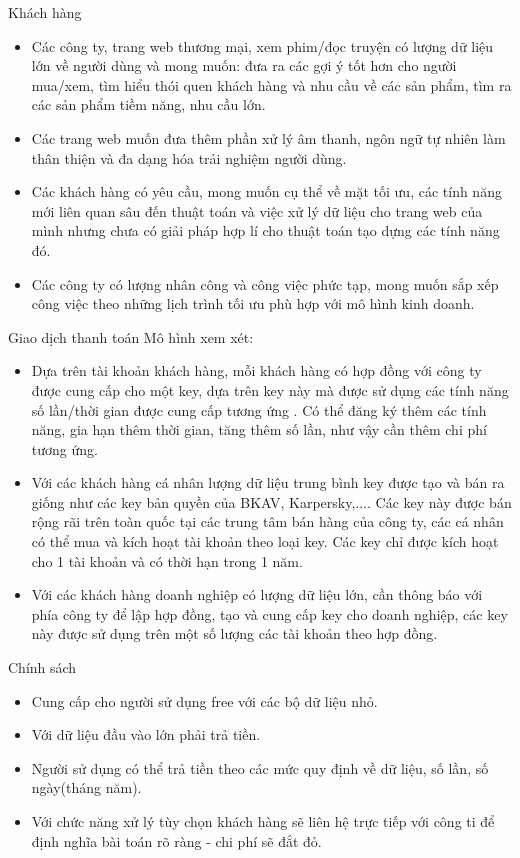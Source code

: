 \documentclass{beamer}
\begin{document}
\begin{frame}{Khách hàng}
\begin{itemize}
\item Các công ty, trang web  thương mại, xem phim/đọc truyện có lượng dữ liệu lớn về người dùng và mong muốn: đưa ra các gợi ý tốt hơn cho người mua/xem, tìm hiểu thói quen khách hàng và nhu cầu về các sản phẩm, tìm ra các sản phẩm tiềm năng, nhu cầu lớn.
\item Các trang web muốn đưa thêm phần xử lý âm thanh, ngôn ngữ tự nhiên làm thân thiện và đa dạng hóa trải nghiệm người dùng.
\item Các khách hàng có yêu cầu, mong muốn cụ thể về mặt tối ưu, các tính năng mới liên quan sâu đến thuật toán và việc xử lý dữ liệu cho trang web của mình nhưng chưa có giải pháp hợp lí cho thuật toán tạo dựng các tính năng đó.
\item Các công ty có lượng nhân công và công việc phức tạp, mong muốn sắp xếp công việc theo những lịch trình tối ưu phù hợp với mô hình kinh doanh.
\end{itemize}
\end{frame}
\begin{frame}{Giao dịch thanh toán}
Mô hình xem xét:
\begin{itemize}
\item Dựa trên tài khoản khách hàng, mỗi khách hàng có hợp đồng với công ty được cung cấp cho một key, dựa trên key này mà được sử dụng các tính năng số lần/thời gian  được cung cấp tương ứng . Có thể đăng ký thêm các tính năng, gia hạn thêm thời gian, tăng thêm số lần,  như vậy cần thêm chi phí tương ứng.
\item Với các khách hàng cá nhân lượng dữ liệu trung bình key được tạo và bán ra giống như các key bản quyền của BKAV, Karpersky,.... Các key này được bán rộng rãi trên toàn quốc tại các trung tâm bán hàng của công ty, các cá nhân có thể mua và kích hoạt tài khoản theo loại key. Các key chỉ được kích hoạt cho 1 tài khoản và có thời hạn trong 1 năm. 
\item Với các khách hàng doanh nghiệp có lượng dữ liệu lớn, cần thông báo với phía công ty để lập hợp đồng, tạo và cung cấp key cho doanh nghiệp, các key này được sử dụng trên một số lượng các tài khoản theo hợp đồng.

\end{itemize}

\end{frame}
\begin{frame}{Chính sách}
\begin{itemize}
\item Cung cấp cho người sử dụng free với các bộ dữ liệu nhỏ.
\item Với dữ liệu đầu vào lớn phải trả tiền.
\item Người sử dụng có thể trả tiền theo các mức quy định về dữ liệu, số lần, số ngày(tháng năm).
\item Với chức năng xử lý tùy chọn khách hàng sẽ liên hệ trực tiếp với công ti để định nghĩa bài toán rõ ràng - chi phí sẽ đắt đỏ.
\end{itemize}
\end{frame}
\end{document}
